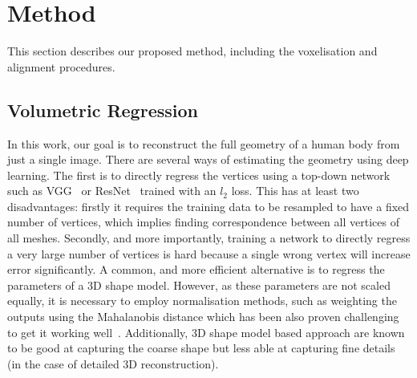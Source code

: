 


\section{Method}

This section describes our proposed method, including the voxelisation
and alignment procedures.

\subsection{Volumetric Regression}

In this work, our goal is to reconstruct the full geometry of a human
body from just a single image.  There are several ways of estimating
the geometry using deep learning. The first is to directly regress the
vertices using a top-down network such as VGG~\cite{simonyan2014vgg}
or ResNet~\cite{he2015deep} trained with an $l_2$ loss. This has at
least two disadvantages: firstly it requires the training data to be
resampled to have a fixed number of vertices, which implies finding
correspondence between all vertices of all meshes. Secondly, and more
importantly, training a network to directly regress a very large
number of vertices is hard because a single wrong vertex will increase
error significantly. A common, and more efficient alternative is to
regress the parameters of a 3D shape model. However, as these
parameters are not scaled equally, it is necessary to employ
normalisation methods, such as weighting the outputs using the
Mahalanobis distance which has been also proven challenging to get it
working well~\cite{jackson2017vrn}. Additionally, 3D shape model based
approach are known to be good at capturing the coarse shape but less
able at capturing fine details (in the case of detailed 3D
reconstruction).

